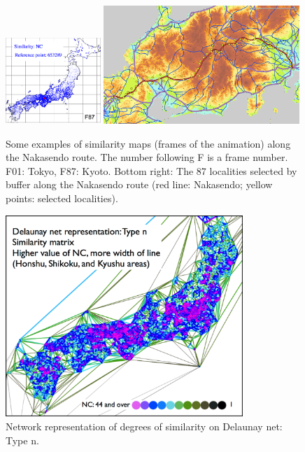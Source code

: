 \documentclass[output=paper]{LSP/langsci}
\begin{document}
\begin{figure}
\\
\includegraphics[width=0.32\textwidth]{illustrations/kuma_fig21-F87}
\includegraphics[width=0.66\textwidth]{illustrations/kuma_fig21-Points}
\caption{Some examples of similarity maps (frames of the animation) along the Nakasendo route. The number following F is a frame number. F01: Tokyo, F87: Kyoto. Bottom right: The 87 localities selected by buffer along the Nakasendo route (red line: Nakasendo; yellow points: selected localities).}          
\label{fig:21}
\end{figure}

\begin{figure}
\includegraphics[width=0.8\textwidth]{illustrations/kuma_fig22}
\caption{Network representation of degrees of similarity on Delaunay net: Type n.}
\label{fig:22}
\end{figure}
\end{document}
